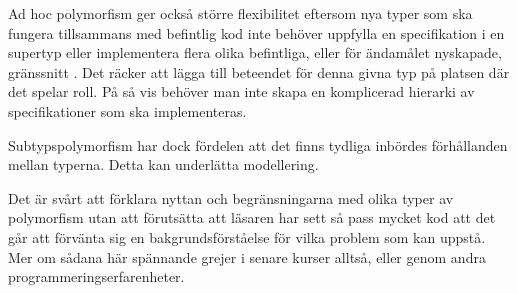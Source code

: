 Ad hoc polymorfism ger också större flexibilitet eftersom nya typer som ska fungera tillsammans 
med befintlig kod inte behöver uppfylla en specifikation i en supertyp eller implementera flera olika befintliga, 
eller för ändamålet nyskapade, gränssnitt . 
Det räcker att lägga till beteendet för denna givna typ på platsen där det spelar roll.
På så vis behöver man inte skapa en komplicerad hierarki av specifikationer som ska implementeras.

Subtypspolymorfism har dock fördelen att det finns tydliga inbördes förhållanden mellan typerna. Detta kan
underlätta modellering.

Det är svårt att förklara nyttan och begränsningarna med olika typer av polymorfism utan att förutsätta
att läsaren har sett så pass mycket kod att det går att förvänta sig en bakgrundsförståelse för vilka problem som
kan uppstå. Mer om sådana här spännande grejer i senare kurser alltså, eller genom andra programmeringserfarenheter.

\QUESTEND









